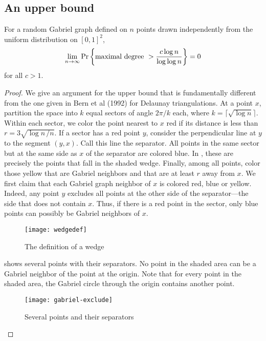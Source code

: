 \documentclass[lotsofwhite,charterfonts]{patmorin}
\newcommand{\PROB}{\Pr}
\begin{document}
\subsection{An upper bound}

\begin{thm}
For a random Gabriel graph defined on $n$ points drawn
independently from the uniform distribution on
$[0,1]^2$, 
\[
\lim_{n\to\infty} \PROB \left\{ \hbox{\rm maximal degree}~> {c \log n \over
\log \log n} \right\} = 0
\]
for all $c > 1$.
\end{thm}

\begin{proof}
We give an argument for the upper bound that is fundamentally
different from the one given in Bern et al (1992) for Delaunay
triangulations.
At a point $x$, partition the space into $k$ equal
sectors of angle $2\pi/k$ each, where $k = \lceil \sqrt{\log n} \rceil$.
Within each sector, we color the point nearest to $x$ 
red if its distance is less than $r = 3 \sqrt{\log n\, /n}$.
If a sector has a red point $y$, consider the perpendicular
line at $y$ to the segment $(y,x)$. Call this
line the separator. All points
in the same sector but at the same side as $x$ of the separator
are colored blue. In , these are precisely the points that
fall in the shaded wedge.
Finally, among all points, color those yellow that are
Gabriel neighbors and that are at least $r$ away from $x$.
We first claim that each Gabriel graph neighbor of $x$
is colored red, blue or yellow.
Indeed, any point $y$ excludes all points at the
other side of the separator---the side that does not contain $x$.
Thus, if there is a red point in the sector, only blue points
can possibly be Gabriel neighbors of $x$.


\begin{figure}
\begin{center}\texttt{[image: wedgedef]}\end{center}
\caption{The definition of a wedge}
\end{figure}

 shows several points with their separators.
No point in the shaded area can be a Gabriel neighbor of the point at the
origin. Note that for every point in the shaded area, the Gabriel circle
through the origin contains another point.

\begin{figure}
\begin{center}\texttt{[image: gabriel-exclude]}\end{center}
\caption{Several points and their separators}
\end{figure}


\end{proof}
\end{document}
